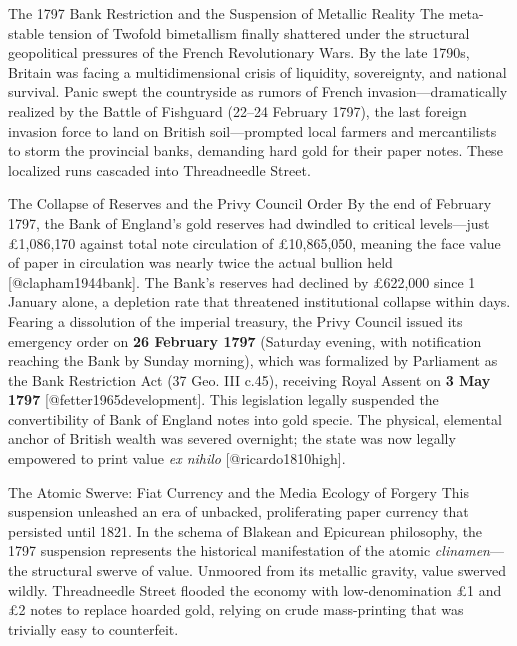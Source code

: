 \documentclass[
  ignorenonframetext,
]{beamer}
\author{\texorpdfstring{}{}}
\date{}
\begin{document}
\begin{frame}{The 1797 Bank Restriction and the Suspension of Metallic
Reality}
\protect{}\label{the-1797-bank-restriction-and-the-suspension-of-metallic-reality}
The meta-stable tension of Twofold bimetallism finally shattered under
the structural geopolitical pressures of the French Revolutionary Wars.
By the late 1790s, Britain was facing a multidimensional crisis of
liquidity, sovereignty, and national survival. Panic swept the
countryside as rumors of French invasion---dramatically realized by the
Battle of Fishguard (22--24 February 1797), the last foreign invasion
force to land on British soil---prompted local farmers and mercantilists
to storm the provincial banks, demanding hard gold for their paper
notes. These localized runs cascaded into Threadneedle Street.

\begin{block}{The Collapse of Reserves and the Privy Council Order}
\protect{}\label{the-collapse-of-reserves-and-the-privy-council-order}
By the end of February 1797, the Bank of England's gold reserves had
dwindled to critical levels---just £1,086,170 against total note
circulation of £10,865,050, meaning the face value of paper in
circulation was nearly twice the actual bullion held
{[}@clapham1944bank{]}. The Bank's reserves had declined by £622,000
since 1 January alone, a depletion rate that threatened institutional
collapse within days. Fearing a dissolution of the imperial treasury,
the Privy Council issued its emergency order on \textbf{26 February
1797} (Saturday evening, with notification reaching the Bank by Sunday
morning), which was formalized by Parliament as the Bank Restriction Act
(37 Geo. III c.45), receiving Royal Assent on \textbf{3 May 1797}
{[}@fetter1965development{]}. This legislation legally suspended the
convertibility of Bank of England notes into gold specie. The physical,
elemental anchor of British wealth was severed overnight; the state was
now legally empowered to print value \emph{ex nihilo}
{[}@ricardo1810high{]}.
\end{block}

\begin{block}{The Atomic Swerve: Fiat Currency and the Media Ecology of
Forgery}
\protect{}\label{the-atomic-swerve-fiat-currency-and-the-media-ecology-of-forgery}
This suspension unleashed an era of unbacked, proliferating paper
currency that persisted until 1821. In the schema of Blakean and
Epicurean philosophy, the 1797 suspension represents the historical
manifestation of the atomic \emph{clinamen}---the structural swerve of
value. Unmoored from its metallic gravity, value swerved wildly.
Threadneedle Street flooded the economy with low-denomination £1 and £2
notes to replace hoarded gold, relying on crude mass-printing that was
trivially easy to counterfeit.


\end{block}
\end{frame}
\end{document}
